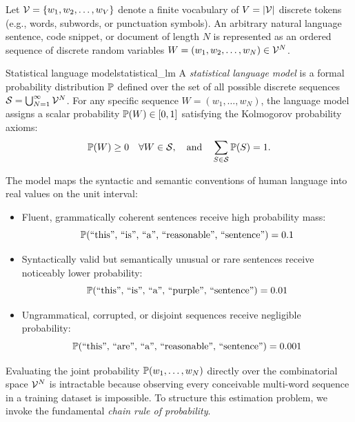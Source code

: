 \documentclass[../../main.tex]{subfiles}
\begin{document}
Let $\mathcal{V} = \{w_1, w_2, \dots, w_V\}$ denote a finite vocabulary of $V = |\mathcal{V}|$ discrete tokens (e.g., words, subwords, or punctuation symbols). An arbitrary natural language sentence, code snippet, or document of length $N$ is represented as an ordered sequence of discrete random variables $W = (w_1, w_2, \dots, w_N) \in \mathcal{V}^N$.

\begin{definition}{Statistical language model}{statistical_lm}
A \emph{statistical language model} is a formal probability distribution $\mathbb{P}$ defined over the set of all possible discrete sequences $\mathcal{S} = \bigcup_{N=1}^\infty \mathcal{V}^N$. For any specific sequence $W = (w_1, \dots, w_N)$, the language model assigns a scalar probability $\mathbb{P}(W) \in [0, 1]$ satisfying the Kolmogorov probability axioms:
\begin{equation}
\label{eq:total_prob}
\mathbb{P}(W) \ge 0 \quad \forall W \in \mathcal{S}, \quad \text{and} \quad \sum_{S \in \mathcal{S}} \mathbb{P}(S) = 1.
\end{equation}
\end{definition}

The model maps the syntactic and semantic conventions of human language into real values on the unit interval:
\begin{itemize}
    \item Fluent, grammatically coherent sentences receive high probability mass:
    \[
    \mathbb{P}(\text{``this'', ``is'', ``a'', ``reasonable'', ``sentence''}) = 0.1
    \]
    \item Syntactically valid but semantically unusual or rare sentences receive noticeably lower probability:
    \[
    \mathbb{P}(\text{``this'', ``is'', ``a'', ``purple'', ``sentence''}) = 0.01
    \]
    \item Ungrammatical, corrupted, or disjoint sequences receive negligible probability:
    \[
    \mathbb{P}(\text{``this'', ``are'', ``a'', ``reasonable'', ``sentence''}) = 0.001
    \]
\end{itemize}

Evaluating the joint probability $\mathbb{P}(w_1, \dots, w_N)$ directly over the combinatorial space $\mathcal{V}^N$ is intractable because observing every conceivable multi-word sequence in a training dataset is impossible. To structure this estimation problem, we invoke the fundamental \emph{chain rule of probability}.
\end{document}
